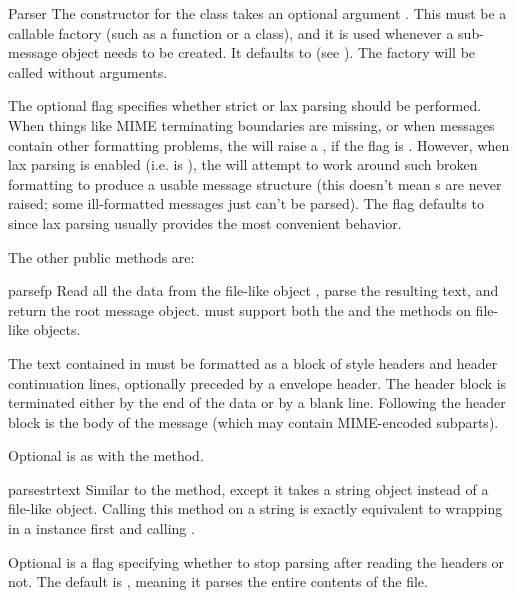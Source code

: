 \begin{classdesc}{Parser}{}
The constructor for the  class takes an optional
argument .  This must be a callable factory (such as a
function or a class), and it is used whenever a sub-message object
needs to be created.  It defaults to  (see
).  The factory will be called without
arguments.

The optional  flag specifies whether strict or lax parsing
should be performed.  When things like MIME terminating
boundaries are missing, or when messages contain other formatting
problems, the  will raise a
, if the  flag is .
However, when lax parsing is enabled (i.e.  is ),
the  will attempt to work around such broken formatting to
produce a usable message structure (this doesn't mean
s are never raised; some ill-formatted
messages just can't be parsed).  The  flag defaults to
 since lax parsing usually provides the most convenient
behavior.

\end{classdesc}

The other public  methods are:

\begin{methoddesc}[Parser]{parse}{fp}
Read all the data from the file-like object , parse the
resulting text, and return the root message object.   must
support both the  and the  methods
on file-like objects.

The text contained in  must be formatted as a block of 
style headers and header continuation lines, optionally preceded by a
envelope header.  The header block is terminated either by the
end of the data or by a blank line.  Following the header block is the
body of the message (which may contain MIME-encoded subparts).

Optional  is as with the  method.

\end{methoddesc}

\begin{methoddesc}[Parser]{parsestr}{text}
Similar to the  method, except it takes a string
object instead of a file-like object.  Calling this method on a string
is exactly equivalent to wrapping  in a 
instance first and calling .

Optional  is a flag specifying whether to stop
parsing after reading the headers or not.  The default is ,
meaning it parses the entire contents of the file.

\end{methoddesc}

